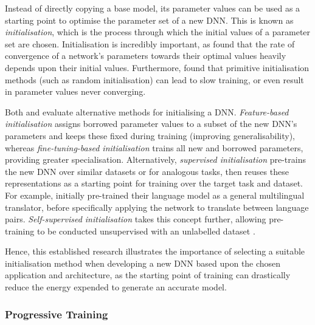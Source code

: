 \documentclass[a4paper, 11pt]{report}
\begin{document}
    Instead of directly copying a base model, its parameter values can be used as a starting point to optimise the parameter set of a new DNN. This is known as \emph{initialisation}, which is the process through which the initial values of a parameter set are chosen. Initialisation is incredibly important, as \citet{xu-2021} found that the rate of convergence of a network's parameters towards their optimal values heavily depends upon their initial values. Furthermore, \citet{hanin-2018} found that primitive initialisation methods (such as random initialisation) can lead to slow training, or even result in parameter values never converging.

    Both \citet{hanin-2018} and \citet{xu-2021} evaluate alternative methods for initialising a DNN. \emph{Feature-based initialisation} assigns borrowed parameter values to a subset of the new DNN's parameters and keeps these fixed during training (improving generalisability), whereas \emph{fine-tuning-based initialisation} trains all new and borrowed parameters, providing greater specialisation. Alternatively, \emph{supervised initialisation} pre-trains the new DNN over similar datasets or for analogous tasks, then reuses these representations as a starting point for training over the target task and dataset. For example, \citet{lin-2021} initially pre-trained their language model as a general multilingual translator, before specifically applying the network to translate between language pairs. \emph{Self-supervised initialisation} takes this concept further, allowing pre-training to be conducted unsupervised with an unlabelled dataset \citep{peters-2018}.

    Hence, this established research illustrates the importance of selecting a suitable initialisation method when developing a new DNN based upon the chosen application and architecture, as the starting point of training can drastically reduce the energy expended to generate an accurate model.


    \subsubsection{Progressive Training}
    \label{section: progressive-training}
\end{document}
